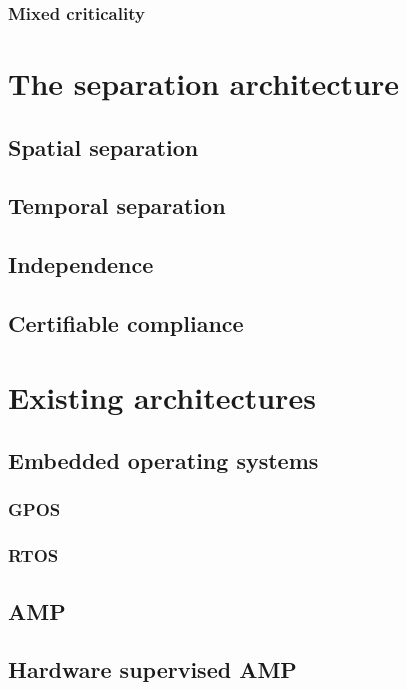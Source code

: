 \subsubsection{Mixed criticality}


\section{The separation architecture}
\subsection{Spatial separation}
\subsection{Temporal separation}
\subsection{Independence}
\subsection{Certifiable compliance}


\section{Existing architectures}
\subsection{Embedded operating systems}
\subsubsection{GPOS}
\subsubsection{RTOS}
\subsection{AMP}
\subsection{Hardware supervised AMP}
